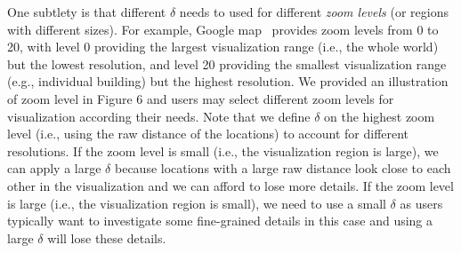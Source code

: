 

One subtlety is that different $\delta$ needs to used for different \emph{zoom levels} (or regions with different sizes).
For example, Google map~\cite{googlemap} provides zoom levels from 0 to 20, with level 0 providing the largest visualization range (i.e., the whole world) but the lowest resolution, and level 20 providing the smallest visualization range (e.g., individual building) but the highest resolution.
We provided an illustration of zoom level in Figure 6 and users may select different zoom levels for visualization according their needs.
Note that we define $\delta$ on the highest zoom level (i.e., using the raw distance of the locations) to account for different resolutions.
If the zoom level is small (i.e., the visualization region is large), we can apply a large $\delta$ because locations with a large raw distance look close to each other in the visualization and we can afford to lose more details.
If the zoom level is large (i.e., the visualization region is small), we need to use a small $\delta$ as users typically want to investigate some fine-grained details in this case and using a large $\delta$ will lose these details.




